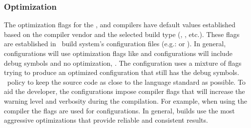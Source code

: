 \subsubsection{Optimization}
\label{sec:optimization}

The optimization flags for the ,  and    compilers have default values established 
based on the compiler vendor and the selected build type (, , etc.).  These flags
are established in \draco\ build system's configuration files  
(e.g.:  or ).  In general,  configurations will use optimization flags like  and  configurations will include debug symbols and no optimization, .  The  configuration uses a mixture of flags trying to produce an optimized configuration that still has the debug symbols.  \draco\ policy to keep the source code as close to the language standard as possible.   To aid the developer, the  configurations impose compiler flags that will increase the warning level and verbosity during the compilation.  For example, when using the  compiler the flags  are used for  configurations. In general,  builds use the most aggressive optimizations that provide reliable and consistent results.



